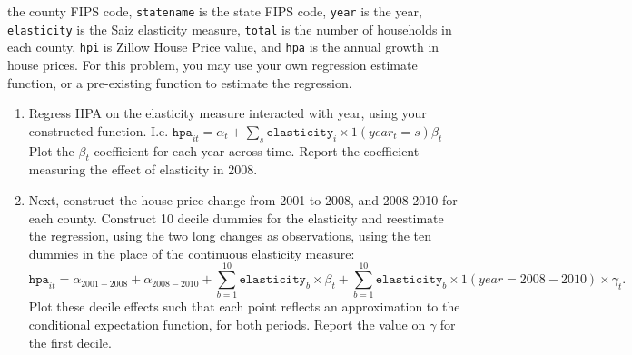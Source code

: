 \documentclass[11pt, a4paper]{article}
\begin{document}
\begin{enumerate}
the county FIPS code, \texttt{statename} is the state FIPS code,
\texttt{year} is the year, \texttt{elasticity} is the Saiz
elasticity measure, \texttt\texttt{total} is the number of
households in each county, \texttt{hpi} is Zillow House Price value, and \texttt{hpa} is the annual growth in house prices. For this problem, you may use your own regression estimate function, or a pre-existing function to estimate the regression.
\begin{enumerate}
\item Regress HPA on the elasticity measure interacted with year, using your constructed function. I.e. $\texttt{hpa}_{it} = \alpha_{t} + \sum_{s}\texttt{elasticity}_{i}\times 1(year_{t} = s)\beta_{t}$ Plot the $\beta_{t}$ coefficient for each year across time. Report the coefficient measuring the effect of elasticity in 2008.
\item Next, construct the house price change from 2001 to 2008, and 2008-2010 for each county.  Construct 10 decile dummies for the elasticity and reestimate the regression, using the two long changes as observations, using the ten dummies in the place of the continuous elasticity measure:
\begin{equation*}
  \texttt{hpa}_{it} = \alpha_{2001-2008} + \alpha_{2008-2010} + \sum_{b = 1}^{10}\texttt{elasticity}_{b}\times \beta_{t} + \sum_{b = 1}^{10}\texttt{elasticity}_{b}\times 1(year = 2008-2010) \times \gamma_{t}.
\end{equation*}
Plot these decile effects such that each point reflects an approximation to the conditional expectation function, for both periods. Report the value on $\gamma$ for the first decile.
\end{enumerate}
\end{enumerate}
\end{document}
